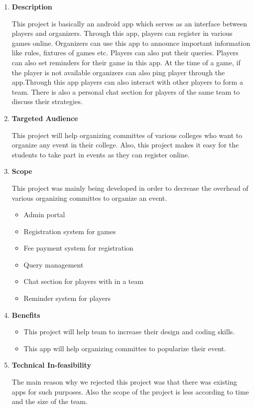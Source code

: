 \documentclass[fleqn,10pt]{../SelfArx} %
\begin{document}
\vspace{0.5cm}
\begin{enumerate}
\item \textbf{Description}

This project is basically an android app which serves as an interface between players and organizers. Through this app, players can register in various games online. Organizers can use this app to announce important information like rules, fixtures of games etc. Players can also put their queries. Players can also set reminders for their game in this app. At the time of a game, if the player is not available organizers can also ping player through the app.Through this app players can also interact with other players to form a team. There is also a personal chat section for players of the same team to discuss their strategies.

\item \textbf{ Targeted Audience}

This project will help organizing committes of various colleges who want to organize any event in their college. Also, this project makes it easy for the students to take part in events as they can register online.

\item \textbf{Scope}

This project was mainly being developed in order to decrease the overhead of various organizing committes to organize an event.

\begin{itemize}
    \item   Admin portal
 \item  Registration system for games
 \item  Fee payment system for registration
 \item  Query management
 \item  Chat section for players with in a team
 \item  Reminder system for players
\end{itemize}



\item \textbf{Benefits}

\begin{itemize}
    \item   This project will help team to increase their design and coding skills.
    \item   This app will help organizing committes to popularize their event.
  
\end{itemize}

\item \textbf{ Technical In-feasibility }

The main reason why we rejected this project was that there was existing apps for such purposes. Also the scope of the project is less according to time and the size of the team. 
\end{enumerate}
\end{document}
